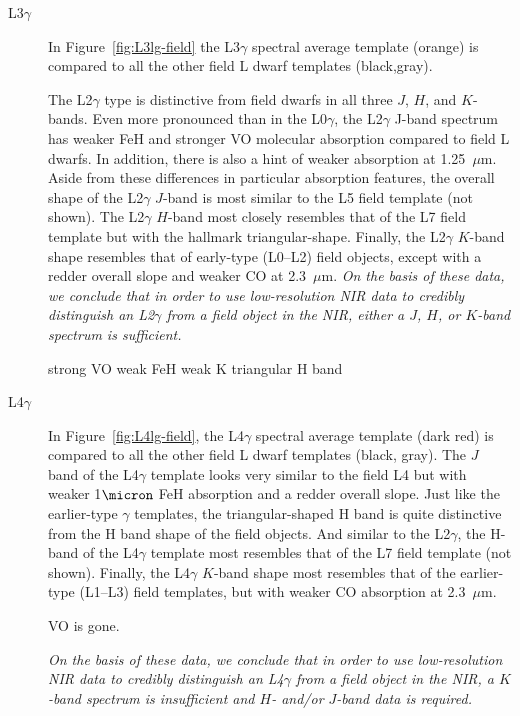 \documentclass[12pt,preprint]{aastex}
\begin{document}
\begin{description}
\item[L3$\gamma$]{
In Figure~\ref{fig:L3lg-field} the L3$\gamma$ spectral average template (orange) is compared to all the other field L dwarf templates (black,gray). 

The L2$\gamma$ type is distinctive from field dwarfs in all three $J$, $H$, and $K$-bands. 
Even more pronounced than in the L0$\gamma$, the L2$\gamma$ J-band spectrum has weaker FeH and stronger VO molecular absorption compared to field L dwarfs. 
In addition, there is also a hint of weaker  absorption at 1.25~$\mu$m. Aside from these differences in particular absorption features, the overall shape of the L2$\gamma$ $J$-band is most similar to the L5 field template (not shown).
The L2$\gamma$ $H$-band most closely resembles that of the L7 field template but with the hallmark  triangular-shape. 
Finally, the L2$\gamma$ $K$-band shape resembles that of early-type (L0--L2) field objects, except with a redder overall slope and weaker CO at 2.3~$\mu$m. 
\emph{On the basis of these data, we conclude that in order to use low-resolution NIR data to credibly distinguish an L2$\gamma$ from a field object in the NIR, either a $J$, $H$, or $K$-band spectrum is sufficient.}

strong VO
weak FeH
weak K
triangular H band
}

\item[L4$\gamma$]{
In Figure~\ref{fig:L4lg-field}, the L4$\gamma$ spectral average template (dark red) is compared to all the other field L dwarf templates (black, gray). 
The $J$ band of the L4$\gamma$ template looks very similar to the field L4 but with weaker 1$\micron$ FeH absorption and a redder overall slope. 
Just like the earlier-type $\gamma$ templates, the triangular-shaped H band is quite distinctive from the H band shape of the field objects. And similar to the L2$\gamma$, the H-band of the L4$\gamma$ template most resembles that of the L7 field template (not shown).
Finally, the L4$\gamma$ $K$-band shape most resembles that of the earlier-type (L1--L3) field templates, but with weaker CO absorption at 2.3~$\mu$m.

VO is gone.

\emph{On the basis of these data, we conclude that in order to use low-resolution NIR data to credibly distinguish an L4$\gamma$ from a field object in the NIR, a $K$-band spectrum is insufficient and $H$- and/or $J$-band data is required.}
}
\end{description}
\end{document}
